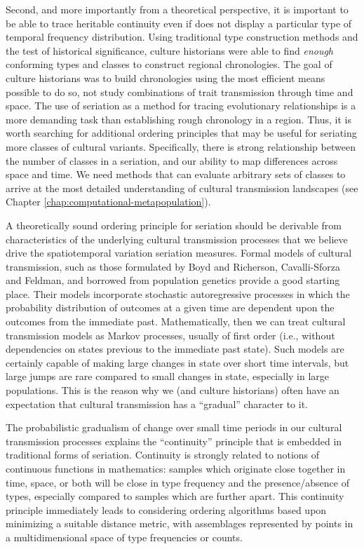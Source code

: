Second, and more importantly from a theoretical perspective, it is
important to be able to trace heritable continuity even if does not
display a particular type of temporal frequency distribution. Using
traditional type construction methods and the test of historical
significance, culture historians were able to find \emph{enough}
conforming types and classes to construct regional chronologies. The
goal of culture historians was to build chronologies using the most
efficient means possible to do so, not study combinations of trait
transmission through time and space. The use of seriation as a method
for tracing evolutionary relationships is a more demanding task than
establishing rough chronology in a region. Thus, it is worth searching
for additional ordering principles that may be useful for seriating more
classes of cultural variants. Specifically, there is strong relationship
between the number of classes in a seriation, and our ability to map
differences across space and time. We need methods that can evaluate
arbitrary sets of classes to arrive at the most detailed understanding
of cultural transmission landscapes (see Chapter \ref{chap:computational-metapopulation}).

A theoretically sound ordering principle for seriation should be
derivable from characteristics of the underlying cultural transmission
processes that we believe drive the spatiotemporal variation seriation
measures. Formal models of cultural transmission, such as those
formulated by Boyd and Richerson, Cavalli-Sforza and Feldman, and
borrowed from population genetics
\citep{BR1985, CF1981, Neiman1995} provide a good starting
place. Their models incorporate stochastic autoregressive processes in
which the probability distribution of outcomes at a given time are
dependent upon the outcomes from the immediate past. Mathematically,
then we can treat cultural transmission models as Markov processes,
usually of first order (i.e., without dependencies on states previous to
the immediate past state). Such models are certainly capable of making
large changes in state over short time intervals, but large jumps are
rare compared to small changes in state, especially in large
populations. This is the reason why we (and culture historians) often
have an expectation that cultural transmission has a ``gradual''
character to it.

The probabilistic gradualism of change over small time periods in our
cultural transmission processes explains the ``continuity'' principle
that is embedded in traditional forms of seriation. Continuity is
strongly related to notions of continuous functions in mathematics:
samples which originate close together in time, space, or both will be
close in type frequency and the presence/absence of types, especially
compared to samples which are further apart. This continuity principle
immediately leads to considering ordering algorithms based upon
minimizing a suitable distance metric, with assemblages represented by
points in a multidimensional space of type frequencies or counts.

